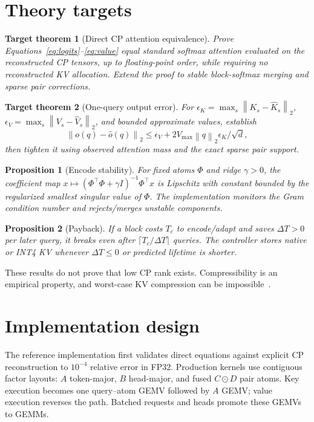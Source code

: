 \documentclass[11pt]{article}
\newtheorem{proposition}{Proposition}
\newtheorem{targettheorem}{Target theorem}
\newcommand{\norm}[1]{\left\lVert #1\right\rVert}
\begin{document}
\section{Theory targets}
\label{sec:theory}

\begin{targettheorem}[Direct CP attention equivalence]
Prove Equations~\eqref{eq:logits}--\eqref{eq:value} equal standard softmax attention evaluated on
the reconstructed CP tensors, up to floating-point order, while requiring no reconstructed KV
allocation. Extend the proof to stable block-softmax merging and sparse pair corrections.
\end{targettheorem}

\begin{targettheorem}[One-query output error]
For $\epsilon_K=\max_s\norm{K_s-\widehat K_s}_2$,
$\epsilon_V=\max_s\norm{V_s-\widehat V_s}_2$, and bounded approximate values, establish
\[
\norm{o(q)-\widehat o(q)}_2
\le \epsilon_V+2V_{\max}\norm q_2\epsilon_K/\sqrt d,
\]
then tighten it using observed attention mass and the exact sparse pair support.
\end{targettheorem}

\begin{proposition}[Encode stability]
For fixed atoms $\Phi$ and ridge $\gamma>0$, the coefficient map
$x\mapsto(\Phi^\top\Phi+\gamma I)^{-1}\Phi^\top x$ is Lipschitz with constant bounded by the
regularized smallest singular value of $\Phi$. The implementation monitors the Gram condition
number and rejects/merges unstable components.
\end{proposition}

\begin{proposition}[Payback]
If a block costs $T_c$ to encode/adapt and saves $\Delta T>0$ per later query, it breaks even after
$\lceil T_c/\Delta T\rceil$ queries. The controller stores native or INT4 KV whenever
$\Delta T\le0$ or predicted lifetime is shorter.
\end{proposition}

These results do not prove that low CP rank exists. Compressibility is an empirical property, and
worst-case KV compression can be impossible~\cite{riskkv}.

\section{Implementation design}

The reference implementation first validates direct equations against explicit CP reconstruction
to $10^{-4}$ relative error in FP32. Production kernels use contiguous factor layouts:
$A$ token-major, $B$ head-major, and fused $C\odot D$ pair atoms. Key execution becomes one
query--atom GEMV followed by $A$ GEMV; value execution reverses the path. Batched requests and heads
promote these GEMVs to GEMMs.
\end{document}
